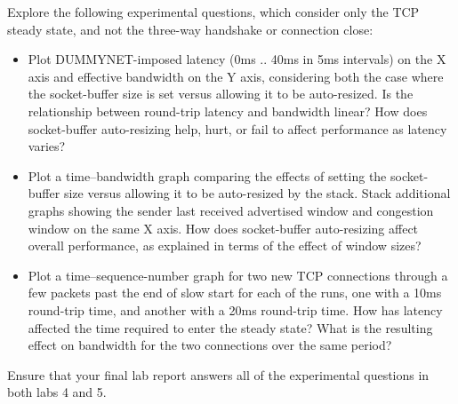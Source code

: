\documentclass[a4paper,10pt]{article}
\begin{document}
\noindent
Explore the following experimental questions, which consider only the TCP
steady state, and not the three-way handshake or connection close:

\begin{itemize}
  \item Plot DUMMYNET-imposed latency (0ms .. 40ms in 5ms intervals) on the X
    axis and effective bandwidth on the Y axis, considering both the case
    where the socket-buffer size is set versus allowing it to be auto-resized.
    Is the relationship between round-trip latency and bandwidth linear?
    How does socket-buffer auto-resizing help, hurt, or fail to affect
    performance as latency varies?

  \item Plot a time--bandwidth graph comparing the effects of setting the
    socket-buffer size versus allowing it to be auto-resized by the stack.
    Stack additional graphs showing the sender last received advertised window
    and congestion window on the same X axis.
    How does socket-buffer auto-resizing affect overall performance, as
    explained in terms of the effect of window sizes?

  \item Plot a time--sequence-number graph for two new TCP connections through
    a few packets past the end of slow start for each of the runs, one with a
    10ms round-trip time, and another with a 20ms round-trip time.
    How has latency affected the time required to enter the steady state?
    What is the resulting effect on bandwidth for the two connections over the
    same period?
\end{itemize}

\noindent
Ensure that your final lab report answers all of the experimental questions in
both labs 4 and 5.
\end{document}
